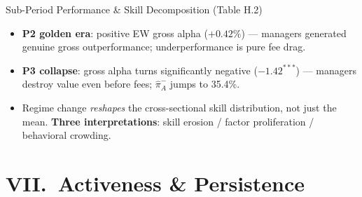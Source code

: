 \documentclass[10pt, aspectratio=169]{beamer}
\begin{document}
\begin{frame}{Sub-Period Performance \& Skill Decomposition (Table H.2)}
  \scriptsize
  \vspace{5pt}
  \begin{itemize}\itemsep3pt
    \item \textbf{P2 golden era}: positive EW gross alpha ($+0.42\%$) — managers
          generated genuine gross outperformance; underperformance is pure fee drag.
    \item \textbf{P3 collapse}: gross alpha turns significantly negative ($-1.42^{***}$) —
          managers destroy value even before fees; $\hat{\pi}^-_A$ jumps to 35.4\%.
    \item Regime change \emph{reshapes} the cross-sectional skill distribution, not just the mean.
          \textbf{Three interpretations}: skill erosion / factor proliferation / behavioral crowding.
  \end{itemize}
\end{frame}

\section{VII.\ Activeness \& Persistence}
\end{document}
